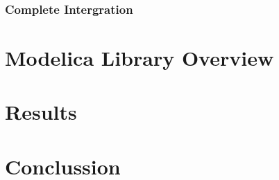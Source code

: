 \documentclass[we,final,11pt,oneside,openany]{uantwerpenbamathesis}
\begin{document}
\subsection{Complete Intergration}
\label{subsec:complete-integration}

\chapter{Modelica Library Overview}
\label{ch:modelica-library-overview}


\chapter{Results}
\label{ch:results}

\chapter{Conclussion}
\label{ch:conclussion}

\appendix



\end{document}
